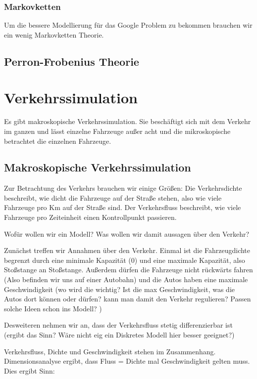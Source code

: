 \documentclass[]{article}
\begin{document}
\subsubsection{Markovketten}
Um die bessere Modellierung für das Google Problem zu bekommen brauchen wir ein wenig Markovketten Theorie. 




\subsection{Perron-Frobenius Theorie}

    




\section{Verkehrssimulation}
Es gibt makroskopische Verkehrssimulation. Sie beschäftigt sich mit dem Verkehr im ganzen und lässt einzelne Fahrzeuge außer acht und die mikroskopische betrachtet die einzelnen Fahrzeuge. 

\subsection{Makroskopische Verkehrssimulation}
Zur Betrachtung des Verkehrs brauchen wir einige Größen: Die Verkehrsdichte beschreibt, wie dicht die Fahrzeuge auf der Straße stehen, also wie viele Fahrzeuge pro Km auf der Straße sind. Der Verkehrsfluss beschreibt, wie viele Fahrzeuge pro Zeiteinheit einen Kontrollpunkt passieren. 

Wofür wollen wir ein Modell?  Was wollen wir damit aussagen über den Verkehr? 

Zunächst treffen wir Annahmen über den Verkehr. Einmal ist die Fahrzeugdichte begrenzt durch eine minimale Kapazität (0) und eine maximale Kapazität, also Stoßstange an Stoßstange. Außerdem dürfen die Fahrzeuge nicht rückwärts fahren (Also befinden wir uns auf einer Autobahn) und die Autos haben eine maximale Geschwindigkeit (wo wird die wichtig? Ist die max Geschwindigkeit, was die Autos dort können oder dürfen? kann man damit den Verkehr regulieren? Passen solche Ideen schon ins Modell? )

Desweiteren nehmen wir an, dass der Verkehrsfluss stetig differenzierbar ist (ergibt das Sinn? Wäre nicht eig ein Diskretes Modell hier besser geeignet?)

Verkehrsfluss, Dichte und Geschwindigkeit stehen im Zusammenhang. Dimensionsanalyse ergibt, dass Fluss = Dichte mal Geschwindigkeit gelten muss. Dies ergibt Sinn:  \\
\end{document}
